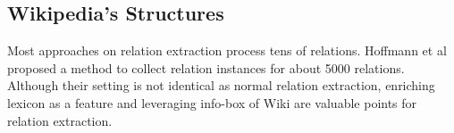 \documentclass[10pt]{article} %
\theoremstyle{definition}
\theoremstyle{definition}
\begin{document}
\subsection{Wikipedia's Structures}
Most approaches on relation extraction process tens of relations. 
Hoffmann et al~\cite{learn5000} proposed a method to collect relation instances for about 5000 relations. 
Although their setting is not identical as normal relation extraction, enriching lexicon as a feature and 
leveraging info-box of Wiki are valuable points for relation extraction. 
\end{document}
